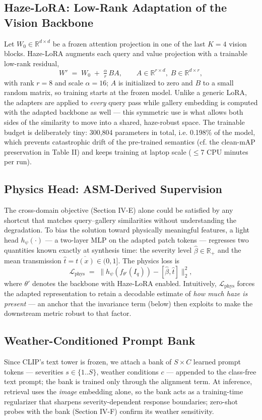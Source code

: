 \documentclass[journal]{IEEEtran}
\begin{document}
\subsection{Haze-LoRA: Low-Rank Adaptation of the Vision Backbone}
Let $W_0 \in \mathbb{R}^{d \times d}$ be a frozen attention projection in
one of the last $K{=}4$ vision blocks. Haze-LoRA augments each query and
value projection with a trainable low-rank residual,
\begin{equation*}W' \;=\; W_0 \;+\; \tfrac{\alpha}{r}\, B A, \qquad
A \in \mathbb{R}^{r \times d},\; B \in \mathbb{R}^{d \times r},
\tag{2}\end{equation*}
with rank $r{=}8$ and scale $\alpha{=}16$; $A$ is initialized to zero and
$B$ to a small random matrix, so training starts at the frozen model.
Unlike a generic LoRA, the adapters are applied to \emph{every} query pass while
gallery embedding is computed with the adapted backbone as well --- this
symmetric use is what allows both sides of the similarity to move into a
shared, haze-robust space. The trainable budget is deliberately tiny:
300,804 parameters in total, i.e. 0.198\% of the model, which prevents
catastrophic drift of the pre-trained semantics (cf. the clean-mAP
preservation in Table II) and keeps training at laptop scale ($\leq$7 CPU
minutes per run).
\subsection{Physics Head: ASM-Derived Supervision}
The cross-domain objective (Section IV-E) alone could be satisfied by any
shortcut that matches query--gallery similarities without understanding the
degradation. To bias the solution toward physically meaningful features, a
light head $h_\psi(\cdot)$ --- a two-layer MLP on the adapted patch tokens ---
regresses two quantities known exactly at synthesis time: the severity
level $\hat{\beta} \in \mathbb{R}_+$ and the mean transmission
$\hat{t} = \overline{t(x)} \in (0, 1]$. The physics loss is
\begin{equation*}\mathcal{L}_{\text{phys}}
\;=\;
\bigl\| h_\psi(f_{\theta'}(I_q)) - [\hat{\beta}, \hat{t}] \bigr\|_2^2 ,
\tag{3}\end{equation*}
where $\theta'$ denotes the backbone with Haze-LoRA enabled. Intuitively,
$\mathcal{L}_{\text{phys}}$ forces the adapted representation to retain a
decodable estimate of \emph{how much haze is present} --- an anchor that the
invariance term (below) then exploits to make the downstream metric robust
to that factor.
\subsection{Weather-Conditioned Prompt Bank}
Since CLIP's text tower is frozen, we attach a bank of $S{\times}C$
learned prompt tokens --- severities $s \in \{1..S\}$, weather conditions
$c$ --- appended to the class-free text prompt; the bank is trained only
through the alignment term. At inference, retrieval uses the \emph{image}
embedding alone, so the bank acts as a training-time regularizer that
sharpens severity-dependent response boundaries; zero-shot probes with the
bank (Section IV-F) confirm its weather sensitivity.
\end{document}
